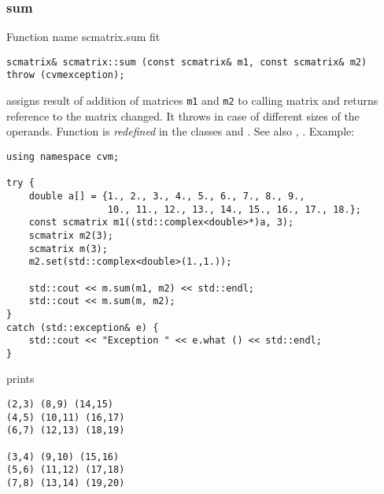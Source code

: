\subsubsection{sum}
Function%
\pdfdest name {scmatrix.sum} fit
\begin{verbatim}
scmatrix& scmatrix::sum (const scmatrix& m1, const scmatrix& m2)
throw (cvmexception);
\end{verbatim}
assigns  result of addition of
matrices \verb"m1" and \verb"m2"  to  calling matrix
and returns  reference to
the matrix changed.
It throws  
in case of different sizes of the operands.
Function is \emph{redefined} in the classes
and .
See also ,
.
Example:
\begin{Verbatim}
using namespace cvm;

try {
    double a[] = {1., 2., 3., 4., 5., 6., 7., 8., 9.,
                  10., 11., 12., 13., 14., 15., 16., 17., 18.};
    const scmatrix m1((std::complex<double>*)a, 3);
    scmatrix m2(3);
    scmatrix m(3);
    m2.set(std::complex<double>(1.,1.));

    std::cout << m.sum(m1, m2) << std::endl;
    std::cout << m.sum(m, m2);
}
catch (std::exception& e) {
    std::cout << "Exception " << e.what () << std::endl;
}
\end{Verbatim}
prints
\begin{Verbatim}
(2,3) (8,9) (14,15)
(4,5) (10,11) (16,17)
(6,7) (12,13) (18,19)

(3,4) (9,10) (15,16)
(5,6) (11,12) (17,18)
(7,8) (13,14) (19,20)
\end{Verbatim}
\newpage



